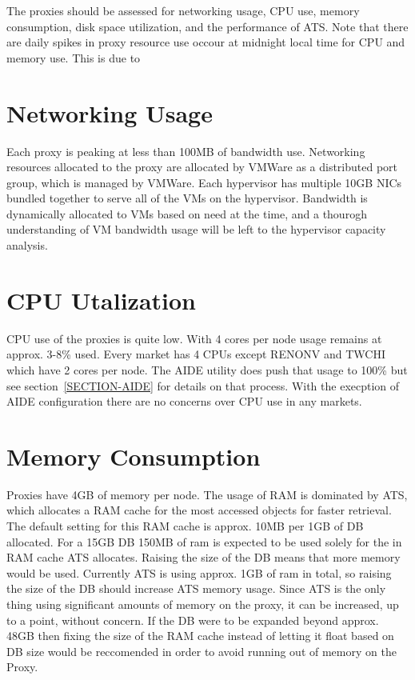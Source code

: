 \documentclass{article}
\begin{document}
The proxies should be assessed for networking usage, CPU use, memory consumption, disk space utilization, and the performance of ATS. Note that there are daily spikes in proxy resource use occour at midnight local time for CPU and memory use. This is due to 



\section{Networking Usage}
\label{SECTION-Networking}

Each proxy is peaking at less than 100MB of bandwidth use. Networking resources allocated to the proxy are allocated by VMWare as a distributed port group, which is managed by VMWare. Each hypervisor has multiple 10GB NICs bundled together to serve all of the VMs on the hypervisor. Bandwidth is dynamically allocated to VMs based on need at the time, and a thourogh understanding of VM bandwidth usage will be left to the hypervisor capacity analysis. 



\section{CPU Utalization}
\label{SECTION-CPUUse}

CPU use of the proxies is quite low. With 4 cores per node usage remains at approx. 3-8\% used. Every market has 4 CPUs except RENONV and TWCHI which have 2 cores per node. The AIDE utility does push that usage to 100\% but see section~\ref{SECTION-AIDE} for details on that process. With the execption of AIDE configuration there are no concerns over CPU use in any markets. 



\section{Memory Consumption}
\label{SECTION-Memory}

Proxies have 4GB of memory per node. The usage of RAM is dominated by ATS, which allocates a RAM cache for the most accessed objects for faster retrieval. The default setting for this RAM cache is approx. 10MB per 1GB of DB allocated. For a 15GB DB 150MB of ram is expected to be used solely for the in RAM cache ATS allocates. Raising the size of the DB means that more memory would be used. Currently ATS is using approx. 1GB of ram in total, so raising the size of the DB should increase ATS memory usage. Since ATS is the only thing using significant amounts of memory on the proxy, it can be increased, up to a point, without concern. If the DB were to be expanded beyond approx. 48GB then fixing the size of the RAM cache instead of letting it float based on DB size would be reccomended in order to avoid running out of memory on the Proxy.
\end{document}
